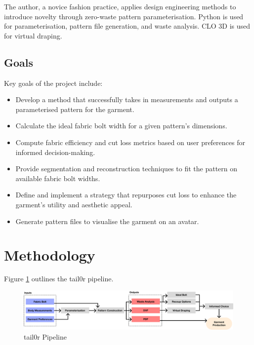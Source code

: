 The author, a novice  fashion practice, applies design engineering methods to introduce novelty through zero-waste pattern parameterisation. Python is used for parameterisation, pattern file generation, and waste analysis. CLO 3D is used for virtual draping.

\subsection{Goals}
Key goals of the project include:
\begin{itemize}
    \item Develop a method that successfully takes in measurements and outputs a parameterised pattern for the garment.
    \item Calculate the ideal fabric bolt width for a given pattern's dimensions.
    \item Compute fabric efficiency and cut loss metrics based on user preferences for informed decision-making.
    \item Provide segmentation and reconstruction techniques to fit the pattern on available fabric bolt widths.
    \item Define and implement a strategy that repurposes cut loss to enhance the garment's utility and aesthetic appeal.
    \item Generate pattern files to visualise the garment on an avatar.
\end{itemize}

\section{Methodology}
Figure \ref{fig:tail0r pipeline} outlines the tail0r pipeline.

\begin{figure} [H]
    \centering
    \includegraphics[width = \textwidth]{Images/tailor pipeline.png}
    \caption{tail0r Pipeline}
    \label{fig:tail0r pipeline}
\end{figure}

